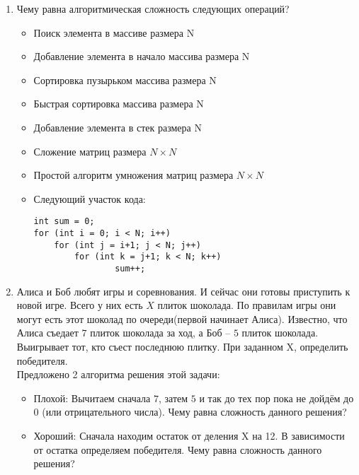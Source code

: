 \documentclass{article}
\begin{document}
\begin{enumerate}
\item \textbf{} Чему равна алгоритмическая сложность следующих операций?
\begin{itemize}
\item Поиск элемента в массиве размера N
\item Добавление элемента в начало массива размера N
\item Сортировка пузырьком массива размера N
\item Быстрая сортировка массива размера N
\item Добавление элемента в стек размера N
\item Сложение матриц размера  $N \times N$
\item Простой алгоритм умножения матриц размера  $N \times N$
\item Следующий участок кода:
\begin{verbatim}
int sum = 0;
for (int i = 0; i < N; i++)
    for (int j = i+1; j < N; j++)
        for (int k = j+1; k < N; k++)
                sum++;
\end{verbatim}
\end{itemize}

\item Алиса и Боб любят игры и соревнования. И сейчас они готовы приступить к новой игре. Всего у них есть $X$ плиток шоколада. По правилам игры они могут есть этот шоколад по очереди(первой начинает Алиса). Известно, что Алиса съедает $7$ плиток шоколада за ход, а Боб -- $5$ плиток шоколада. Выигрывает тот, кто съест последнюю плитку. При заданном X, определить победителя. \\
Предложено 2 алгоритма решения этой задачи:
\begin{itemize}
\item Плохой: Вычитаем сначала $7$, затем $5$ и так до тех пор пока не дойдём до $0$ (или отрицательного числа). Чему равна сложность данного решения?
\item Хороший: Сначала находим остаток от деления X на 12. В зависимости от остатка определяем победителя. Чему равна сложность данного решения?
\end{itemize}
\end{enumerate}

\newpage
\end{document}
